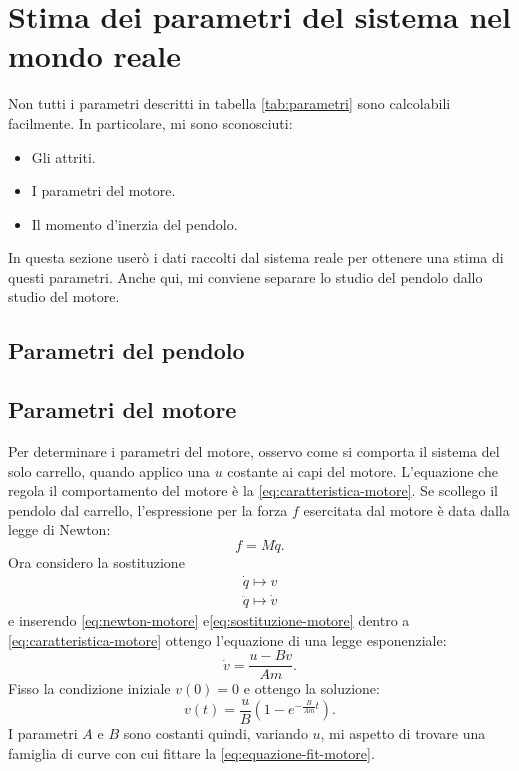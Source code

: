 \section{Stima dei parametri del sistema nel mondo reale}
Non tutti i parametri descritti in tabella \ref{tab:parametri} sono calcolabili facilmente. In particolare, mi sono sconosciuti:
\begin{itemize}
    \item Gli attriti.
    \item I parametri del motore.
    \item Il momento d'inerzia del pendolo.
\end{itemize}
In questa sezione userò i dati raccolti dal sistema reale per ottenere una stima di questi parametri. Anche qui, mi conviene separare lo studio del pendolo dallo studio del motore.

\subsection{Parametri del pendolo}



\subsection{Parametri del motore}
\label{subsec:parametri-motore}
Per determinare i parametri del motore, osservo come si comporta il sistema del solo
carrello, quando applico una \ddp $u$ costante ai capi del motore.
L'equazione che regola il comportamento del motore è la \eqref{eq:caratteristica-motore}.
Se scollego il pendolo dal carrello, l'espressione per la forza $f$
esercitata dal motore è data dalla legge di Newton:
\begin{equation}
    f = M \ddot q.
    \label{eq:newton-motore}
\end{equation}
Ora considero la sostituzione
\begin{equation}
    \begin{aligned}
    \dot q \mapsto v \\
    \ddot q \mapsto \dot v
    \end{aligned}
    \label{eq:sostituzione-motore}
\end{equation}
e inserendo \eqref{eq:newton-motore} e\eqref{eq:sostituzione-motore} dentro a \eqref{eq:caratteristica-motore}
ottengo l'equazione di una legge esponenziale:
\begin{equation*}
    \dot v = \frac{u - B v} {Am}.
\end{equation*}
Fisso la condizione iniziale $v(0) = 0$ e ottengo la soluzione:
\begin{equation}
    v(t) = \frac u B \left(1 - e^{-\frac B {Am} t}\right).
    \label{eq:equazione-fit-motore}
\end{equation}
I parametri $A$ e $B$ sono costanti quindi, variando $u$, mi aspetto di trovare
una famiglia di curve con cui fittare la \eqref{eq:equazione-fit-motore}.


